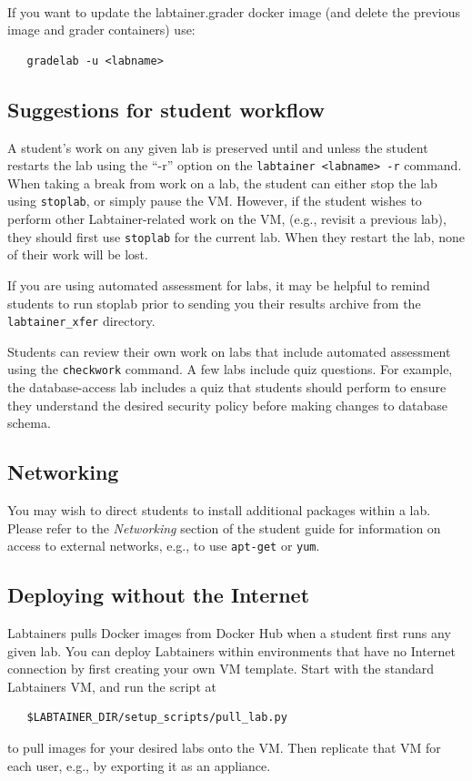 \documentclass[12pt]{article}
\begin{document}
\noindent \\If you want to update the labtainer.grader docker image (and delete the previous image and grader containers) use:
\begin{verbatim}
   gradelab -u <labname>
\end{verbatim}


\subsection{Suggestions for student workflow}
A student's work on any given lab is preserved until and unless the student restarts the lab using the ``-r'' 
option on the {\tt labtainer <labname> -r} command.  When taking a break from work on a lab, the student can
either stop the lab using {\tt stoplab}, or simply pause the VM.  However, if the student wishes to perform other
Labtainer-related work on the VM, (e.g., revisit a previous lab), they should first use {\tt stoplab} for the current
lab.  When they restart the lab, none of their work will be lost.

If you are using automated assessment for labs, it may be helpful to remind students to run stoplab prior to 
sending you their results archive from the {\tt labtainer\_xfer} directory.

Students can review their own work on labs that include automated assessment using the {\tt checkwork} command.
A few labs include quiz questions.  For example, the database-access lab includes a quiz that students should perform
to ensure they understand the desired security policy before making changes to database schema.

\subsection{Networking}
You may wish to direct students to install additional packages within a lab.  Please refer to the \textit{Networking} section
of the student guide for information on access to external networks, e.g., to use {\tt apt-get} or {\tt yum}.

\subsection{Deploying without the Internet}
Labtainers pulls Docker images from Docker Hub when a student first runs any given lab.  You can deploy
Labtainers within environments that have no Internet connection by first creating your own 
VM template.  Start with the standard Labtainers VM, and run the script at 
\begin{verbatim}
   $LABTAINER_DIR/setup_scripts/pull_lab.py
\end{verbatim}
\noindent to pull images for your desired labs onto the VM.  Then replicate that VM for each user, e.g., by
exporting it as an appliance.
\end{document}
